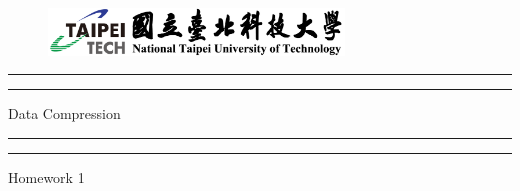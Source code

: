 \documentclass[a4paper, 11pt, oneside]{article} %
\begin{document}
 

\begin{titlepage} %

	\centering %
	
	\scshape %
	
    \vspace*{\baselineskip} %
    
    \begin{figure}

        \centering

        \includegraphics[width=0.7\textwidth]{logo}

    \end{figure}
	
	
	\rule{\textwidth}{1.6pt}\vspace*{-\baselineskip}\vspace*{2pt} %
	\rule{\textwidth}{0.4pt} %
	
	\vspace{0.75\baselineskip} %
	
	{\LARGE Data Compression} %
	
	\vspace{0.75\baselineskip} %
	
	\rule{\textwidth}{0.4pt}\vspace*{-\baselineskip}\vspace{3.2pt} %
	\rule{\textwidth}{1.6pt} %
	
	\vspace{2\baselineskip} %
	
	
	Homework 1 %
	
	\vspace*{3\baselineskip} %
	

\end{titlepage}
\end{document}
